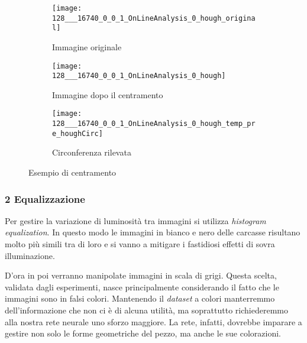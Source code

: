 \begin{figure}[ht] %
  \begin{center}
    \begin{subfigure}{.49\linewidth}
      \centering\texttt{[image: 128\_\_\_16740\_0\_0\_1\_OnLineAnalysis\_0\_hough\_original]}
      \caption{Immagine originale}
      \label{fig:p1_originale}
    \end{subfigure}
    \begin{subfigure}{.49\linewidth}
      \centering\texttt{[image: 128\_\_\_16740\_0\_0\_1\_OnLineAnalysis\_0\_hough]}
      \caption{Immagine dopo il centramento}
      \label{fig:p1_centrata}
    \end{subfigure}
    \begin{subfigure}{.49\linewidth}
      \centering\texttt{[image: 128\_\_\_16740\_0\_0\_1\_OnLineAnalysis\_0\_hough\_temp\_pre\_houghCirc]}
      \caption{Circonferenza rilevata}
      \label{fig:p1_circ}
    \end{subfigure}
  \end{center}
  \caption{Esempio di centramento}
  \label{fig:centramento}
\end{figure}

\subsubsection{2 Equalizzazione}
Per gestire la variazione di luminosità tra immagini si utilizza \textit{histogram equalization}.
In questo modo le immagini in bianco e nero delle carcasse risultano molto più simili tra di loro e si vanno a mitigare i fastidiosi effetti di sovra illuminazione.

D'ora in poi verranno manipolate immagini in scala di grigi.
Questa scelta, validata dagli esperimenti, nasce principalmente considerando il fatto che le immagini sono in falsi colori.
Mantenendo il \textit{dataset} a colori manterremmo dell'informazione che non ci è di alcuna utilità, ma soprattutto richiederemmo alla nostra rete neurale uno sforzo maggiore.
La rete, infatti, dovrebbe imparare a gestire non solo le forme geometriche del pezzo, ma anche le sue colorazioni.


